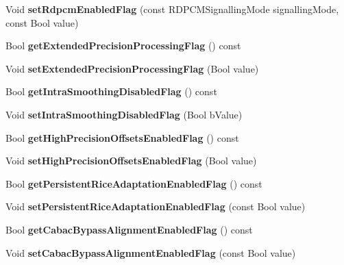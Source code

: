 \begin{DoxyCompactItemize}
Void {\bfseries set\+Rdpcm\+Enabled\+Flag} (const R\+D\+P\+C\+M\+Signalling\+Mode signalling\+Mode, const Bool value)
\item 
\mbox{\label{class_t_com_s_p_s_r_ext_a97c1b726f932695375a102bd8ecd5296}} 
Bool {\bfseries get\+Extended\+Precision\+Processing\+Flag} () const
\item 
\mbox{\label{class_t_com_s_p_s_r_ext_a4df11ab24809e3f7bf8aef2a4e75a682}} 
Void {\bfseries set\+Extended\+Precision\+Processing\+Flag} (Bool value)
\item 
\mbox{\label{class_t_com_s_p_s_r_ext_abf735a47bb2d0e1f3f2945ca6fb3d0a8}} 
Bool {\bfseries get\+Intra\+Smoothing\+Disabled\+Flag} () const
\item 
\mbox{\label{class_t_com_s_p_s_r_ext_abe4fa2f6d73761400647af3e0c4277a8}} 
Void {\bfseries set\+Intra\+Smoothing\+Disabled\+Flag} (Bool b\+Value)
\item 
\mbox{\label{class_t_com_s_p_s_r_ext_a1eaf8e8220c5b2074cddbdcb121db350}} 
Bool {\bfseries get\+High\+Precision\+Offsets\+Enabled\+Flag} () const
\item 
\mbox{\label{class_t_com_s_p_s_r_ext_ad0ab483570725e71546e96f592dc720d}} 
Void {\bfseries set\+High\+Precision\+Offsets\+Enabled\+Flag} (Bool value)
\item 
\mbox{\label{class_t_com_s_p_s_r_ext_a52bc91996f6877c5c6f3c8bcdecf1566}} 
Bool {\bfseries get\+Persistent\+Rice\+Adaptation\+Enabled\+Flag} () const
\item 
\mbox{\label{class_t_com_s_p_s_r_ext_a0b8b162b9b8f4a349de49d58aa4e0002}} 
Void {\bfseries set\+Persistent\+Rice\+Adaptation\+Enabled\+Flag} (const Bool value)
\item 
\mbox{\label{class_t_com_s_p_s_r_ext_ad60ea7e12dc1fa55da8fd38b60d0ce0e}} 
Bool {\bfseries get\+Cabac\+Bypass\+Alignment\+Enabled\+Flag} () const
\item 
\mbox{\label{class_t_com_s_p_s_r_ext_a74803fb458e04695a4bd4503d74d89ed}} 
Void {\bfseries set\+Cabac\+Bypass\+Alignment\+Enabled\+Flag} (const Bool value)
\end{DoxyCompactItemize}
{\bf }\par



